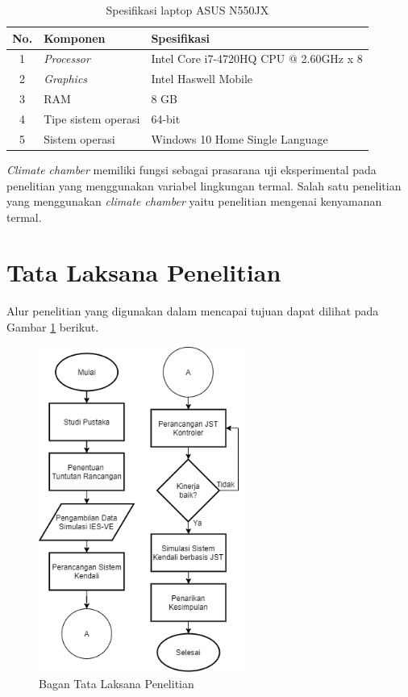 \begin{table}[!h]
	\caption{Spesifikasi laptop ASUS N550JX}
	\label{tbl:4:speklaptop}
	\centering
	\begin{tabular}{|c|p{5cm}|p{8cm}|}
		\hline
		No. & Komponen & Spesifikasi \\ \hline
		1 & \textit{Processor} & Intel Core i7-4720HQ CPU @ 2.60GHz x 8 \\ \hline
		2 & \textit{Graphics} & Intel Haswell Mobile \\ \hline
		3 & RAM & 8 GB \\ \hline
		4 & Tipe sistem operasi & 64-bit \\ \hline
		5 & Sistem operasi & Windows 10 Home Single Language \\ \hline
	\end{tabular}
\end{table}

\textit{Climate chamber} memiliki fungsi sebagai prasarana uji eksperimental pada penelitian yang menggunakan variabel lingkungan termal. Salah satu penelitian yang menggunakan \textit{climate chamber} yaitu penelitian mengenai kenyamanan termal.

\vspace{2em}
\section{Tata Laksana Penelitian}
Alur penelitian yang digunakan dalam mencapai tujuan dapat dilihat pada Gambar \ref{fig:4:TataLaksanaPenelitian} berikut.
\begin{figure}[!h]
	\centering
	\includegraphics[width=0.6\textwidth]{figures/TataLaksanaPenelitian}
	\caption{Bagan Tata Laksana Penelitian}
	\label{fig:4:TataLaksanaPenelitian}
\end{figure}

